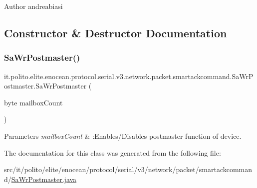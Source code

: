 \begin{DoxyAuthor}{Author}
andreabiasi 
\end{DoxyAuthor}


\subsection{Constructor \& Destructor Documentation}
\hypertarget{classit_1_1polito_1_1elite_1_1enocean_1_1protocol_1_1serial_1_1v3_1_1network_1_1packet_1_1smartackcommand_1_1_sa_wr_postmaster_ab59167c5ea177628d2c366c962f31090}{}\label{classit_1_1polito_1_1elite_1_1enocean_1_1protocol_1_1serial_1_1v3_1_1network_1_1packet_1_1smartackcommand_1_1_sa_wr_postmaster_ab59167c5ea177628d2c366c962f31090} 
\subsubsection{\texorpdfstring{Sa\+Wr\+Postmaster()}{SaWrPostmaster()}}
{\footnotesize\ttfamily it.\+polito.\+elite.\+enocean.\+protocol.\+serial.\+v3.\+network.\+packet.\+smartackcommand.\+Sa\+Wr\+Postmaster.\+Sa\+Wr\+Postmaster (\begin{DoxyParamCaption}\item[{byte}]{mailbox\+Count }\end{DoxyParamCaption})}


\begin{DoxyParams}{Parameters}
{\em mailbox\+Count} & \+:Enables/\+Disables postmaster function of device. \\
\hline
\end{DoxyParams}


The documentation for this class was generated from the following file\+:\begin{DoxyCompactItemize}
\item 
src/it/polito/elite/enocean/protocol/serial/v3/network/packet/smartackcommand/\hyperlink{_sa_wr_postmaster_8java}{Sa\+Wr\+Postmaster.\+java}\end{DoxyCompactItemize}
